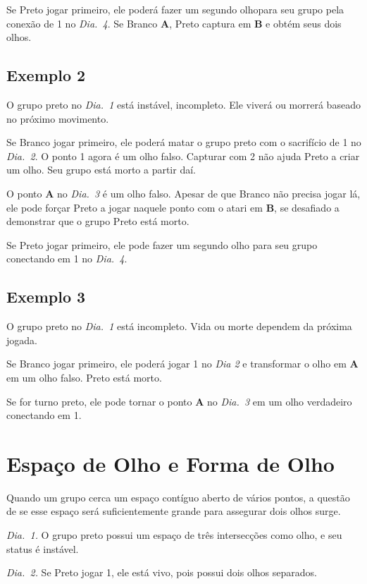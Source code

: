 Se Preto jogar primeiro, ele poderá fazer um segundo olhopara seu grupo pela conexão de 1 no \emph{Dia.\@~4}. Se Branco \textbf{A}, Preto captura em \textbf{B} e obtém seus dois olhos.

\subsection{Exemplo 2}

O grupo preto no \emph{Dia.\@~1} está instável, incompleto. Ele viverá ou morrerá baseado no próximo movimento.

Se Branco jogar primeiro, ele poderá matar o grupo preto com o sacrifício de 1 no \emph{Dia.\@~2}. O ponto 1 agora é um olho falso. Capturar com 2 não ajuda Preto a criar um olho. Seu grupo está morto a partir daí.

O ponto \textbf{A} no \emph{Dia.\@~3} é um olho falso. Apesar de que Branco não precisa jogar lá, ele pode forçar Preto a jogar naquele ponto com o atari em \textbf{B}, se desafiado a demonstrar que o grupo Preto está morto.

Se Preto jogar primeiro, ele pode fazer um segundo olho para seu grupo conectando em 1 no \emph{Dia.\@~4}.

\subsection{Exemplo 3}

O grupo preto no \emph{Dia.\@~1} está incompleto. Vida ou morte dependem da próxima jogada.

Se Branco jogar primeiro, ele poderá jogar 1 no \emph{Dia 2} e transformar o olho em \textbf{A} em um olho falso. Preto está morto.

Se for turno preto, ele pode tornar o ponto \textbf{A} no \emph{Dia.\@~3} em um olho verdadeiro conectando em 1. 

\section{Espaço de Olho e Forma de Olho}

Quando um grupo cerca um espaço contíguo aberto de vários pontos, a questão de se esse espaço será suficientemente grande para assegurar dois olhos surge.

\emph{Dia.\@~1.} O grupo preto possui um espaço de três intersecções como olho, e seu status é instável.

\emph{Dia.\@~2.} Se Preto jogar 1, ele está vivo, pois possui dois olhos separados.

